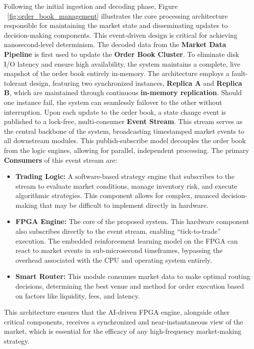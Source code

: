 Following the initial ingestion and decoding phase, Figure ~\ref{fig:order_book_management} illustrates the core processing architecture responsible for maintaining the market state and disseminating updates to decision-making components. This event-driven design is critical for achieving nanosecond-level determinism. The decoded data from the \textbf{Market Data Pipeline} is first used to update the \textbf{Order Book Cluster}. To eliminate disk I/O latency and ensure high availability, the system maintains a complete, live snapshot of the order book entirely in-memory. The architecture employs a fault-tolerant design, featuring two synchronized instances, \textbf{Replica A} and \textbf{Replica B}, which are maintained through continuous \textbf{in-memory replication}. Should one instance fail, the system can seamlessly failover to the other without interruption. Upon each update to the order book, a state change event is published to a lock-free, multi-consumer \textbf{Event Stream}. This stream serves as the central backbone of the system, broadcasting timestamped market events to all downstream modules. This publish-subscribe model decouples the order book from the logic engines, allowing for parallel, independent processing. The primary \textbf{Consumers} of this event stream are: \begin{itemize} 
    \item \textbf{Trading Logic:} A software-based strategy engine that subscribes to the stream to evaluate market conditions, manage inventory risk, and execute algorithmic strategies. This component allows for complex, nuanced decision-making that may be difficult to implement directly in hardware. 
    \item \textbf{FPGA Engine:} The core of the proposed system. This hardware component also subscribes directly to the event stream, enabling ``tick-to-trade'' execution. The embedded reinforcement learning model on the FPGA can react to market events in sub-microsecond timeframes, bypassing the overhead associated with the CPU and operating system entirely. 
    \item \textbf{Smart Router:} This module consumes market data to make optimal routing decisions, determining the best venue and method for order execution based on factors like liquidity, fees, and latency. 
\end{itemize} This architecture ensures that the AI-driven FPGA engine, alongside other critical components, receives a synchronized and near-instantaneous view of the market, which is essential for the efficacy of any high-frequency market-making strategy.

